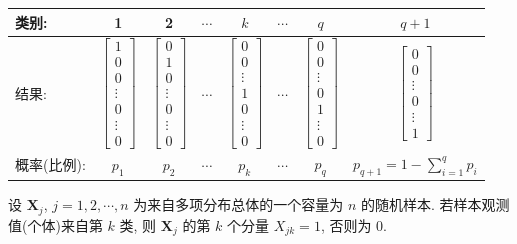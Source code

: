 \begin{center}
\begin{tabular}{lccccccc}
\toprule
类别: & 1 & 2 & $\cdots$ & $k$ & $\cdots$ & $q$ & $q+1$\\
\midrule
结果: &
$\begin{bmatrix}1\\0\\0\\\vdots\\0\\\vdots\\0\end{bmatrix}$ &
$\begin{bmatrix}0\\1\\0\\\vdots\\0\\\vdots\\0\end{bmatrix}$ &
$\cdots$ &
$\begin{bmatrix}0\\0\\\vdots\\1\\0\\\vdots\\0\end{bmatrix}$ &
$\cdots$ &
$\begin{bmatrix}0\\0\\\vdots\\0\\1\\\vdots\\0\end{bmatrix}$ &
$\begin{bmatrix}0\\0\\\vdots\\0\\\vdots\\1\end{bmatrix}$\\
\midrule
概率(比例): & $p_1$ & $p_2$ & $\cdots$ & $p_k$ & $\cdots$ & $p_q$ & $p_{q+1}=1-\sum\limits_{i=1}^{q}p_i$\\
\bottomrule
\end{tabular}
\end{center}

设 $\mathbf{X}_j$, $j=1,2,\cdots,n$ 为来自多项分布总体的一个容量为 $n$ 的随机样本. 若样本观测值(个体)来自第 $k$ 类, 则 $\mathbf{X}_j$ 的第 $k$ 个分量 $X_{jk}=1$, 否则为 0.

